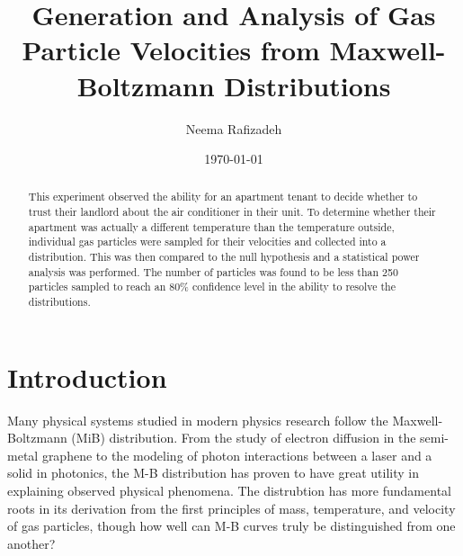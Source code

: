 \documentclass[%
 reprint,
 amsmath,amssymb,
 aps,
]{revtex4-2}
\begin{document}

\title{Generation and Analysis of Gas Particle Velocities from Maxwell-Boltzmann Distributions}%

\author{Neema Rafizadeh}
%

\date{\today}

\begin{abstract}

This experiment observed the ability for an apartment tenant to decide whether to trust their landlord about the air conditioner in their unit. To determine whether their apartment was actually a different temperature than the temperature outside, individual gas particles were sampled for their velocities and collected into a distribution. This was then compared to the null hypothesis and a statistical power analysis was performed. The number of particles was found to be less than 250 particles sampled to reach an 80\% confidence level in the ability to resolve the distributions. 
\end{abstract}


\maketitle


\section{Introduction \protect\\ }

Many physical systems studied in modern physics research follow the Maxwell-Boltzmann (MiB) distribution. From the study of electron diffusion in the semi-metal graphene to the modeling of photon interactions between a laser and a solid in photonics, the M-B distribution has proven to have great utility in explaining observed physical phenomena. The distrubtion has more fundamental roots in its derivation from the first principles of mass, temperature, and velocity of gas particles, though how well can M-B curves truly be distinguished from one another?  
\end{document}
